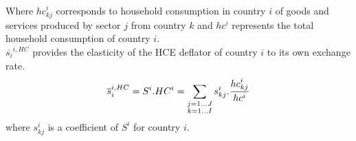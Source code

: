 \documentclass[11pt,a4paper]{paper} %
\begin{document}
Where ${hc}_{kj}^i$ corresponds to household consumption in country $i$ of goods and services produced by sector $j$ from country $k$ and $hc^i$ represents the total household consumption of country $i$. \\
$\overline{s_{i}}^{i,HC}$ provides the elasticity of the HCE deflator of country $i$ to its own exchange rate. 
 \begin{eqnarray}
\overline{s}_{i}^{i,HC}=S^i.HC^i=\underset{\begin{subarray}{c}j=1\dots J \\ k=1 \dots I \end{subarray}}{\mathop \sum}\,{{s}_{kj}^i}.\frac{{hc}_{kj}^i}{hc^i}
\label{eq:eq6}
 \end{eqnarray} 
where ${s}_{kj}^i$ is a coefficient of $S^i$ for country $i$. 
\end{document}
